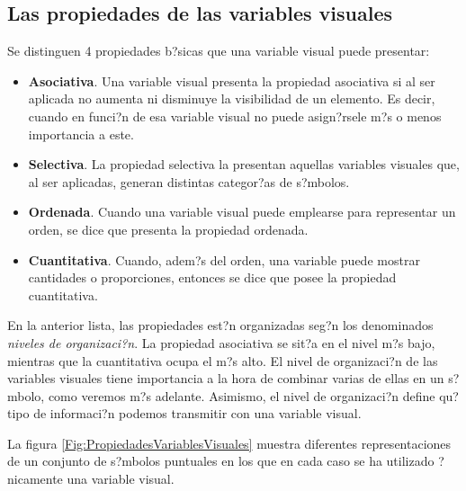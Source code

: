 \subsection{Las propiedades de las variables visuales}

Se distinguen 4 propiedades b?sicas que una variable visual puede presentar:

\begin{itemize}
	\item \textbf{Asociativa}. Una variable visual presenta la propiedad asociativa si al ser aplicada no aumenta ni disminuye la visibilidad de un elemento. Es decir, cuando en funci?n de esa variable visual no puede asign?rsele m?s o menos importancia a este.
	\item \textbf{Selectiva}. La propiedad selectiva la presentan aquellas variables visuales que, al ser aplicadas, generan distintas categor?as de s?mbolos.
	\item \textbf{Ordenada}. Cuando una variable visual puede emplearse para representar un orden, se dice que presenta la propiedad ordenada.
	\item \textbf{Cuantitativa}. Cuando, adem?s del orden, una variable puede mostrar cantidades o proporciones, entonces se dice que posee la propiedad cuantitativa.
\end{itemize}

En la anterior lista, las propiedades est?n organizadas seg?n los denominados \emph{niveles de organizaci?n}. La propiedad asociativa se sit?a en el nivel m?s bajo, mientras que la cuantitativa ocupa el m?s alto. El nivel de organizaci?n de las variables visuales tiene importancia a la hora de combinar varias de ellas en un s?mbolo, como veremos m?s adelante. Asimismo, el nivel de organizaci?n define qu? tipo de informaci?n podemos transmitir con una variable visual.

La figura \ref{Fig:PropiedadesVariablesVisuales} muestra diferentes representaciones de un conjunto de s?mbolos puntuales en los que en cada caso se ha utilizado ?nicamente una variable visual.

